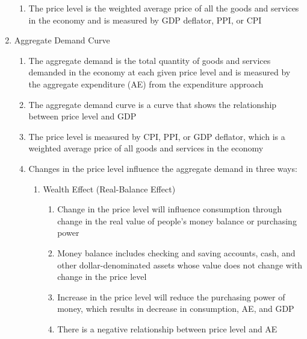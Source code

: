\documentclass[12pt]{article}
\begin{document}
\begin{enumerate}
\begin{enumerate}
          \item The price level is the weighted average price of all the goods and services in the economy and is measured by GDP deflator, PPI, or CPI

        \end{enumerate}

      \item Aggregate Demand Curve

        \begin{enumerate}

          \item The aggregate demand is the total quantity of goods and services demanded in the economy at each given price level and is measured by the aggregate expenditure (AE) from the expenditure approach

          \item The aggregate demand curve is a curve that shows the relationship between price level and GDP

          \item The price level is measured by CPI, PPI, or GDP deflator, which is a weighted average price of all goods and services in the economy

          \item Changes in the price level influence the aggregate demand in three ways:

            \begin{enumerate}

              \item Wealth Effect (Real-Balance Effect)

                \begin{enumerate}

                  \item Change in the price level will influence consumption through change in the real value of people's money balance or purchasing power

                  \item Money balance includes checking and saving accounts, cash, and other dollar-denominated assets whose value does not change with change in the price level

                  \item Increase in the price level will reduce the purchasing power of money, which results in decrease in consumption, AE, and GDP

                  \item There is a negative relationship between price level and AE


\end{enumerate}
\end{enumerate}
\end{enumerate}
\end{enumerate}
\end{document}
